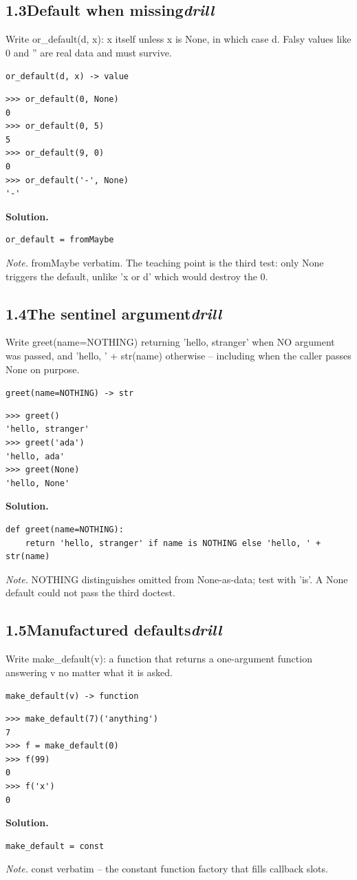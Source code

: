 \documentclass[10pt,letterpaper]{book}
\begin{document}
\subsection*{1.3\quad Default when missing\hfill\textnormal{\textit{drill}}}
Write or\_default(d, x): x itself unless x is None, in which case d. Falsy values like 0 and '' are real data and must survive.

\noindent\texttt{or\_default(d, x) -> value}
\begin{lstlisting}[style=ex]
>>> or_default(0, None)
0
>>> or_default(0, 5)
5
>>> or_default(9, 0)
0
>>> or_default('-', None)
'-'
\end{lstlisting}
\noindent\textbf{Solution.}
\begin{lstlisting}[style=code]
or_default = fromMaybe
\end{lstlisting}
\noindent\textit{Note.} fromMaybe verbatim. The teaching point is the third test: only None triggers the default, unlike 'x or d' which would destroy the 0.

\subsection*{1.4\quad The sentinel argument\hfill\textnormal{\textit{drill}}}
Write greet(name=NOTHING) returning 'hello, stranger' when NO argument was passed, and 'hello, ' + str(name) otherwise -- including when the caller passes None on purpose.

\noindent\texttt{greet(name=NOTHING) -> str}
\begin{lstlisting}[style=ex]
>>> greet()
'hello, stranger'
>>> greet('ada')
'hello, ada'
>>> greet(None)
'hello, None'
\end{lstlisting}
\noindent\textbf{Solution.}
\begin{lstlisting}[style=code]
def greet(name=NOTHING):
    return 'hello, stranger' if name is NOTHING else 'hello, ' + str(name)
\end{lstlisting}
\noindent\textit{Note.} NOTHING distinguishes omitted from None-as-data; test with 'is'. A None default could not pass the third doctest.

\subsection*{1.5\quad Manufactured defaults\hfill\textnormal{\textit{drill}}}
Write make\_default(v): a function that returns a one-argument function answering v no matter what it is asked.

\noindent\texttt{make\_default(v) -> function}
\begin{lstlisting}[style=ex]
>>> make_default(7)('anything')
7
>>> f = make_default(0)
>>> f(99)
0
>>> f('x')
0
\end{lstlisting}
\noindent\textbf{Solution.}
\begin{lstlisting}[style=code]
make_default = const
\end{lstlisting}
\noindent\textit{Note.} const verbatim -- the constant function factory that fills callback slots.
\end{document}
